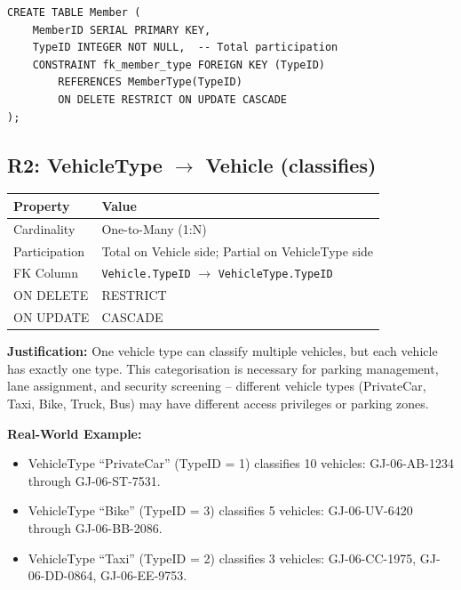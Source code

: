 \documentclass[a4paper, 12pt]{article}
\begin{document}
\begin{lstlisting}[style=sqlstyle, caption={R1 Implementation}, label={lst:r1}]
CREATE TABLE Member (
    MemberID SERIAL PRIMARY KEY,
    TypeID INTEGER NOT NULL,  -- Total participation
    CONSTRAINT fk_member_type FOREIGN KEY (TypeID)
        REFERENCES MemberType(TypeID)
        ON DELETE RESTRICT ON UPDATE CASCADE
);
\end{lstlisting}

\subsection{R2: VehicleType \texorpdfstring{$\rightarrow$}{->} Vehicle (classifies)}

\begin{table}[H]
\centering
\small
\begin{tabularx}{\textwidth}{l X}
\toprule
\textbf{Property} & \textbf{Value} \\
\midrule
Cardinality & One-to-Many (1:N) \\
Participation & Total on Vehicle side; Partial on VehicleType side \\
FK Column & \texttt{Vehicle.TypeID} $\rightarrow$ \texttt{VehicleType.TypeID} \\
ON DELETE & RESTRICT \\
ON UPDATE & CASCADE \\
\bottomrule
\end{tabularx}
\end{table}

\textbf{Justification:} One vehicle type can classify multiple vehicles, but each vehicle has exactly one type. This categorisation is necessary for parking management, lane assignment, and security screening -- different vehicle types (PrivateCar, Taxi, Bike, Truck, Bus) may have different access privileges or parking zones.

\textbf{Real-World Example:}
\begin{itemize}[leftmargin=*, nosep]
    \item VehicleType ``PrivateCar'' (TypeID = 1) classifies 10 vehicles: GJ-06-AB-1234 through GJ-06-ST-7531.
    \item VehicleType ``Bike'' (TypeID = 3) classifies 5 vehicles: GJ-06-UV-6420 through GJ-06-BB-2086.
    \item VehicleType ``Taxi'' (TypeID = 2) classifies 3 vehicles: GJ-06-CC-1975, GJ-06-DD-0864, GJ-06-EE-9753.
\end{itemize}
\end{document}
